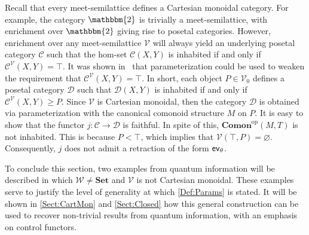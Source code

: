\begin{exa}
    \label{Ex:NoParams}
    Recall that every meet-semilattice defines a Cartesian monoidal category.
    For example, the category $\mathbbm{2}$ is trivially a meet-semilattice, with enrichment over $\mathbbm{2}$ giving rise to posetal categories.
    However, enrichment over any meet-semilattice $\mathcal{V}$ will always yield an underlying posetal category $\mathcal{C}$ such that the hom-set $\mathcal{C}( X, Y )$ is inhabited if and only if $\mathcal{C}^{\mathcal{V}}( X, Y ) = \top$.
    It was shown in~\cite{Wesley2025} that parameterization could be used to weaken the requirement that $\mathcal{C}^{\mathcal{V}}( X, Y ) = \top$.
    In short, each object $P \in \mathcal{V}_0$ defines a posetal category $\mathcal{D}$ such that $\mathcal{D}( X, Y )$ is inhabited if and only if $\mathcal{C}^{\mathcal{V}}( X, Y ) \ge P$.
    Since $\mathcal{V}$ is Cartesian monoidal, then the category $\mathcal{D}$ is obtained via parameterization with the canonical comonoid structure $M$ on $P$.
    It is easy to show that the functor $j: \mathcal{C} \to \mathcal{D}$ is faithful.
    In spite of this, $\mathbf{Comon}^{\text{op}}( M, T )$ is not inhabited.
    This is because $P < \top$, which implies that $\mathcal{V}( \top, P ) = \varnothing$.
    Consequently, $j$ does not admit a retraction of the form $\mathsf{ev}_\theta$.
\end{exa}

To conclude this section, two examples from quantum information will be described in which $\mathcal{W} \ne \mathbf{Set}$ and $\mathcal{V}$ is not Cartesian monoidal.
These examples serve to justify the level of generality at which \cref{Def:Params} is stated.
It will be shown in \cref{Sect:CartMon} and \cref{Sect:Closed} how this general construction can be used to recover non-trivial results from quantum information, with an emphasis on control functors.

